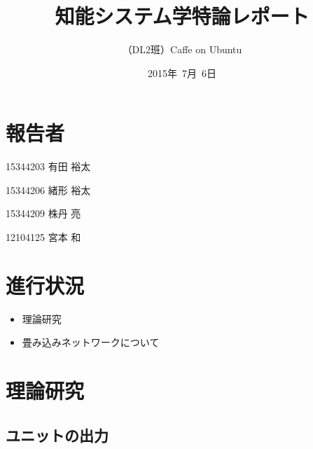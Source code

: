 \documentclass[a4paper,10pt]{jsarticle}
\title{知能システム学特論レポート}
\author{
（DL2班）Caffe on Ubuntu\\
}
\date{2015年\ 7月\ 6日}
\begin{document}
\maketitle
\section{報告者}
\begin{list}{}{}
 \item 15344203\hspace{0.5cm} 有田 裕太
 \item 15344206\hspace{0.5cm} 緒形 裕太
 \item 15344209\hspace{0.5cm} 株丹 亮
 \item 12104125\hspace{0.5cm} 宮本 和
\end{list}

\section{進行状況}

\begin{itemize}
\item 理論研究
\item 畳み込みネットワークについて
\end{itemize}


\section{理論研究}
\subsection{ユニットの出力}
\end{document}
